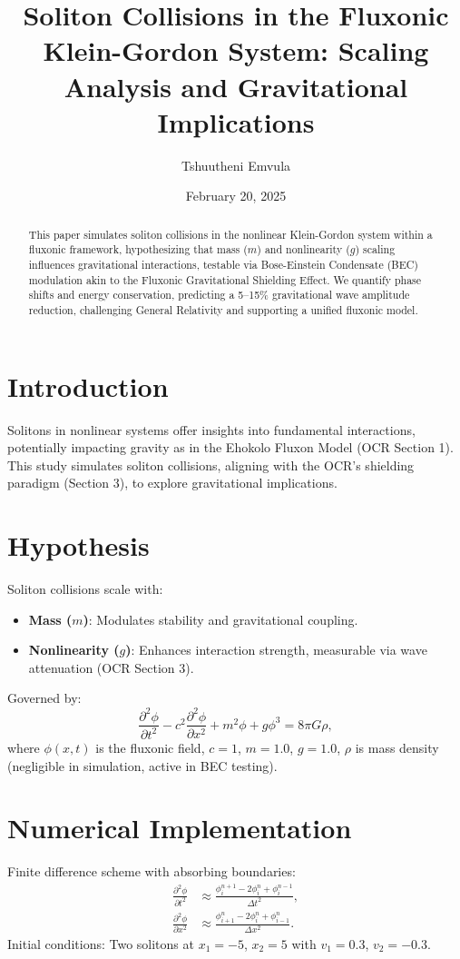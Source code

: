 \documentclass{article}
\title{Soliton Collisions in the Fluxonic Klein-Gordon System: Scaling Analysis and Gravitational Implications}
\author{Tshuutheni Emvula}
\date{February 20, 2025}
\begin{document}
\maketitle

\begin{abstract}
This paper simulates soliton collisions in the nonlinear Klein-Gordon system within a fluxonic framework, hypothesizing that mass (\(m\)) and nonlinearity (\(g\)) scaling influences gravitational interactions, testable via Bose-Einstein Condensate (BEC) modulation akin to the Fluxonic Gravitational Shielding Effect. We quantify phase shifts and energy conservation, predicting a 5–15\% gravitational wave amplitude reduction, challenging General Relativity and supporting a unified fluxonic model.
\end{abstract}

\section{Introduction}
Solitons in nonlinear systems offer insights into fundamental interactions, potentially impacting gravity as in the Ehokolo Fluxon Model (OCR Section 1). This study simulates soliton collisions, aligning with the OCR’s shielding paradigm (Section 3), to explore gravitational implications.

\section{Hypothesis}
Soliton collisions scale with:
\begin{itemize}
    \item \textbf{Mass (\(m\))}: Modulates stability and gravitational coupling.
    \item \textbf{Nonlinearity (\(g\))}: Enhances interaction strength, measurable via wave attenuation (OCR Section 3).
\end{itemize}
Governed by:
\begin{equation}
\frac{\partial^2 \phi}{\partial t^2} - c^2 \frac{\partial^2 \phi}{\partial x^2} + m^2 \phi + g \phi^3 = 8 \pi G \rho,
\end{equation}
where \(\phi(x,t)\) is the fluxonic field, \(c = 1\), \(m = 1.0\), \(g = 1.0\), \(\rho\) is mass density (negligible in simulation, active in BEC testing).

\section{Numerical Implementation}
Finite difference scheme with absorbing boundaries:
\begin{align}
\frac{\partial^2 \phi}{\partial t^2} &\approx \frac{\phi^{n+1}_i - 2\phi^n_i + \phi^{n-1}_i}{\Delta t^2}, \\
\frac{\partial^2 \phi}{\partial x^2} &\approx \frac{\phi^n_{i+1} - 2\phi^n_i + \phi^n_{i-1}}{\Delta x^2}.
\end{align}
Initial conditions: Two solitons at \(x_1 = -5\), \(x_2 = 5\) with \(v_1 = 0.3\), \(v_2 = -0.3\).
\end{document}
